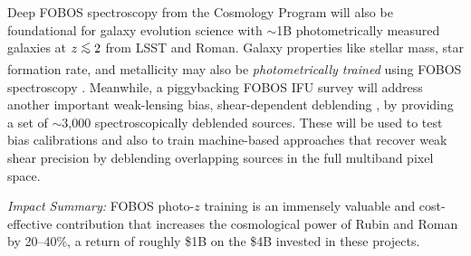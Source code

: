 \documentclass[oneside,11pt]{amsart}
\DeclareRobustCommand{\lesssim}{%
\mathrel{\hskip-.5em\begin{array}{c}<\\[-8pt]\sim\end{array}\hskip-.5em}}
\begin{document}
Deep FOBOS spectroscopy from the Cosmology Program will also be foundational for galaxy evolution science with $\sim$1B photometrically measured galaxies at $z \lesssim 2$ from LSST and Roman.  Galaxy properties like stellar mass, star formation rate, and metallicity may also be \emph{photometrically trained} using FOBOS spectroscopy \citep[see][]{hemmati18}.  Meanwhile, a piggybacking FOBOS IFU survey will address another important weak-lensing bias, shear-dependent deblending \citep{sheldon20}, by providing a set of $\sim$3,000 spectroscopically deblended sources.  These will be used to test bias calibrations and also to train machine-based approaches that recover weak shear precision by deblending overlapping sources in the full multiband pixel space.

\medskip
\noindent \emph{Impact Summary:} FOBOS photo-$z$ training is an immensely valuable and cost-effective contribution that increases the cosmological power of Rubin and Roman by 20--40\%, a return of roughly \$1B on the \$4B invested in these projects.  





\end{document}
